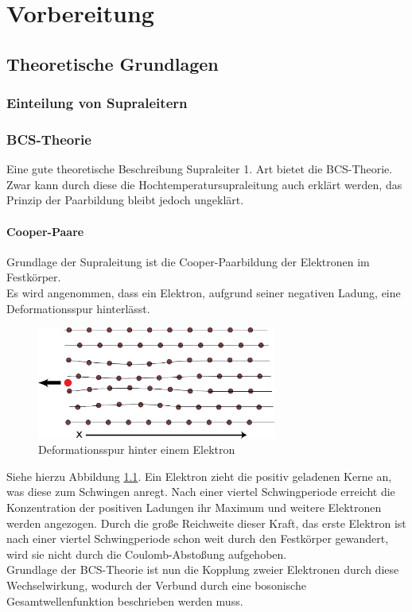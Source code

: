 \chapter{Vorbereitung}

	\section{Theoretische Grundlagen}
	
    \subsection{Einteilung von Supraleitern}

	\subsection{BCS-Theorie}
Eine gute theoretische Beschreibung Supraleiter 1. Art bietet die BCS-Theorie. 
Zwar kann durch diese die Hochtemperatursupraleitung auch erklärt werden, das 
Prinzip der Paarbildung bleibt jedoch ungeklärt.

        \subsubsection{Cooper-Paare}
Grundlage der Supraleitung ist die Cooper-Paarbildung der Elektronen im Festkörper.
\vspace{3pt}\\
Es wird angenommen, dass ein Elektron, aufgrund seiner negativen Ladung, eine 
Deformationsspur hinterlässt. 
\begin{figure}[h]
    \centering
    \includegraphics[width=0.7\textwidth]{Abb/deformation.pdf}
    \caption{Deformationsspur hinter einem Elektron}
    \label{Abb:def}
\end{figure}
Siehe hierzu Abbildung \ref{Abb:def}. Ein Elektron zieht die positiv geladenen Kerne
an, was diese zum Schwingen anregt. Nach einer viertel Schwingperiode erreicht die
Konzentration der positiven Ladungen ihr Maximum und weitere Elektronen werden 
angezogen. Durch die große Reichweite dieser Kraft, das erste Elektron ist nach
einer viertel Schwingperiode schon weit durch den Festkörper gewandert, wird sie
nicht durch die Coulomb-Abstoßung aufgehoben.
\vspace{3pt}\\
Grundlage der BCS-Theorie ist nun die Kopplung zweier Elektronen durch diese 
Wechselwirkung, wodurch der Verbund durch eine bosonische Gesamtwellenfunktion
beschrieben werden muss.

